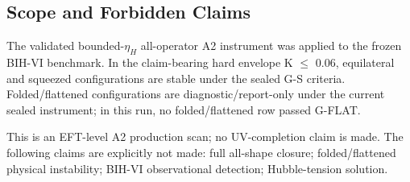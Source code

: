 \subsection{Scope and Forbidden Claims}

The validated bounded-$\eta_H$ all-operator A2 instrument was applied to the frozen BIH-VI benchmark. In the claim-bearing hard envelope K $\leq$ 0.06, equilateral and squeezed configurations are stable under the sealed G-S criteria. Folded/flattened configurations are diagnostic/report-only under the current sealed instrument; in this run, no folded/flattened row passed G-FLAT.

This is an EFT-level A2 production scan; no UV-completion claim is made. The following claims are explicitly not made: full all-shape closure; folded/flattened physical instability; BIH-VI observational detection; Hubble-tension solution.
